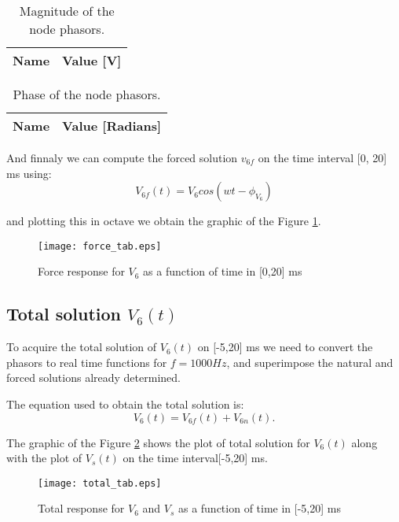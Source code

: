 \begin{table}[H]
  \centering
  \begin{tabular}{|l|r|}
    \hline    
    {\bf Name} & {\bf Value [V]} \\ \hline
    
  \end{tabular}
  \caption{Magnitude of the node phasors.}
  \label{tab:nodal4}
\end{table}

\begin{table}[H]
  \centering
  \begin{tabular}{|l|r|}
    \hline    
    {\bf Name} & {\bf Value [Radians]} \\ \hline
    
  \end{tabular}
  \caption{Phase of the node phasors.}
  \label{tab:nodal4ph}
\end{table}

And finnaly we can compute the forced solution $v_{6f}$ on the time interval [0, 20] ms using:
\begin{equation}
    V_{6f}(t) = V_6cos(wt-\phi_{V_6})
\end{equation}

and plotting this in octave we obtain the graphic of the Figure \ref{fig:forceresponse}.

\begin{figure}[H] \centering
  \texttt{[image: force\_tab.eps]}
  \caption{Force response for $V_6$ as a function of time in [0,20] ms}
  \label{fig:forceresponse}
\end{figure} 


\subsection{Total solution $V_6(t)$}
To acquire the total solution of $V_6(t)$ on [-5,20] ms we need to convert the phasors to real time functions for $f=1000Hz$, and superimpose the natural and forced solutions already determined.

The equation used to obtain the total solution is:
\begin{equation}
    V_6(t) = V_{6f}(t) + V_{6n}(t).
\end{equation}

The graphic of the Figure \ref{fig:totalresponse} shows the plot of total solution for $V_6(t)$ along with the plot of $V_s(t)$ on the time interval[-5,20] ms.

\begin{figure}[H] \centering
  \texttt{[image: total\_tab.eps]}
  \caption{Total response for $V_6$ and $V_s$ as a function of time in [-5,20] ms}
  \label{fig:totalresponse}
\end{figure} 


